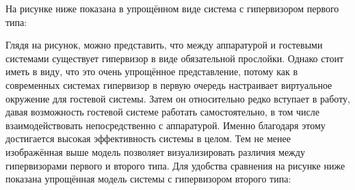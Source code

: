 \documentclass[14pt, a4paper]{article}
\begin{document}
На рисунке ниже показана в упрощённом виде система с гипервизором первого типа:

\begin{figure}[h]%
    \centering
    \label{framework} %
\end{figure}

Глядя на рисунок, можно представить, что между аппаратурой и гостевыми системами существует
гипервизор в виде обязательной прослойки. Однако стоит иметь в виду, что это очень упрощённое
представление, потому как в современных системах гипервизор в первую очередь настраивает
виртуальное окружение для гостевой системы. Затем он относительно редко вступает в работу, давая
возможность гостевой системе работать самостоятельно, в том числе взаимодействовать
непосредственно с аппаратурой. Именно благодаря этому достигается высокая эффективность
системы в целом. Тем не менее изображённая выше модель позволяет визуализировать различия
между гипервизорами первого и второго типа. Для удобства сравнения на рисунке ниже показана
упрощённая модель системы с гипервизором второго типа:

\begin{figure}[h]%
    \centering
    \label{framework} %
\end{figure}
\end{document}
